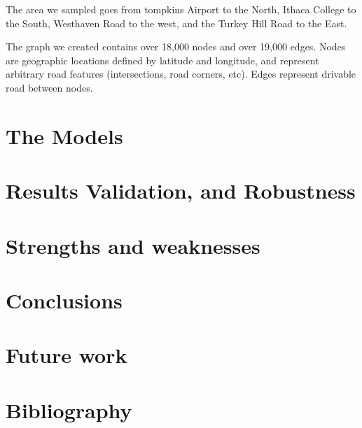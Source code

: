\documentclass{article}
\begin{document}
The area we sampled goes from tompkins Airport to the North, Ithaca College to the South, Westhaven Road to the west, and the Turkey Hill Road to the East.

The graph we created contains over 18,000 nodes and over 19,000 edges. Nodes are geographic locations defined by latitude and longitude, and represent arbitrary road features (intersections, road corners, etc). Edges represent drivable road between nodes. 

\section{The Models}

\section{Results Validation, and Robustness}

\section{Strengths and weaknesses}

\section{Conclusions}

\section{Future work}

\section{Bibliography}
\end{document}
